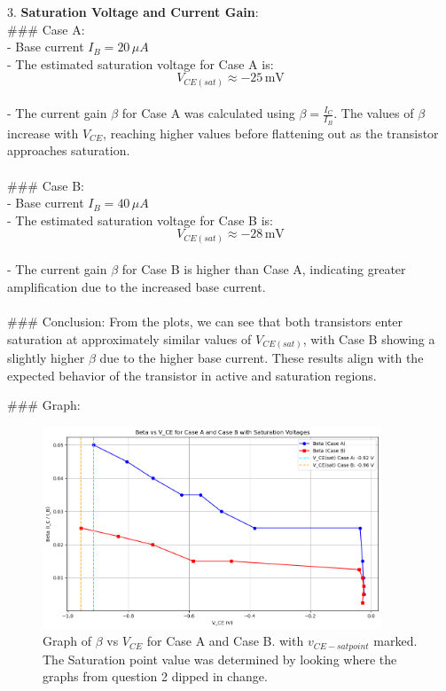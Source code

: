 \documentclass{article}
\begin{document}
3. \textbf{Saturation Voltage and Current Gain}:
\\
### Case A: \\
- Base current \( I_B = 20 \, \mu A \) \\ 
- The estimated saturation voltage for Case A is: \\
  \[
  V_{CE(sat)} \approx -25 \, \text{mV}
  \]
\\
- The current gain \( \beta \) for Case A was calculated using \( \beta = \frac{I_C}{I_B} \). The values of \( \beta \) increase with \( V_{CE} \), reaching higher values before flattening out as the transistor approaches saturation.
\\ \\ 
### Case B: \\ 
- Base current \( I_B = 40 \, \mu A \) \\ 
- The estimated saturation voltage for Case B is: \\
  \[
  V_{CE(sat)} \approx -28 \, \text{mV}
  \]
\\
- The current gain \( \beta \) for Case B is higher than Case A, indicating greater amplification due to the increased base current.
\\ \\
### Conclusion:
From the plots, we can see that both transistors enter saturation at approximately similar values of \( V_{CE(sat)} \), with Case B 
showing a slightly higher \( \beta \) due to the higher base current. These results align with the expected behavior of the 
transistor in active and saturation regions.

### Graph:
\begin{figure}[H]
    \centering
    \includegraphics[width=0.9\textwidth]{./img/Lab5_3.png}
    \caption{Graph of \(\beta\) vs \(V_{CE}\) for Case A and Case B. with \(v_{CE -sat point}\) marked. The Saturation point value was determined by looking where the graphs from question 2 dipped in change.}
    \label{fig:graph1} 
\end{figure}
\end{document}

